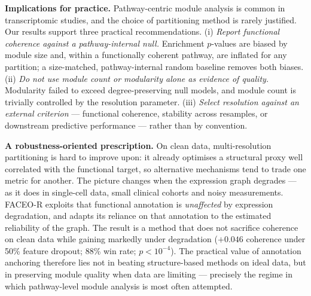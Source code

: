 \documentclass[twocolumn,10pt,a4paper]{article}
\begin{document}
\noindent\textbf{Implications for practice.} Pathway-centric module analysis is common in transcriptomic studies, and the choice of
partitioning method is rarely justified. Our results support three practical
recommendations. (i) \emph{Report functional coherence against a pathway-internal null.}
Enrichment $p$-values are biased by module size and, within a functionally coherent pathway,
are inflated for any partition; a size-matched, pathway-internal random baseline removes
both biases. (ii) \emph{Do not use module count or modularity alone as evidence of quality.}
Modularity failed to exceed degree-preserving null models, and module count is trivially
controlled by the resolution parameter. (iii) \emph{Select resolution against an external
criterion} --- functional coherence, stability across resamples, or downstream predictive
performance --- rather than by convention.

\noindent\textbf{A robustness-oriented prescription.} On clean data, multi-resolution partitioning is hard to improve upon: it already optimises a
structural proxy well correlated with the functional target, so alternative mechanisms tend
to trade one metric for another. The picture changes when the expression graph degrades ---
as it does in single-cell data, small clinical cohorts and noisy measurements. FACEO-R
exploits that functional annotation is \emph{unaffected} by expression degradation,
and adapts its reliance on that annotation to the estimated reliability of the graph. The
result is a method that does not sacrifice coherence on clean data while gaining markedly
under degradation ($+0.046$ coherence under 50\% feature dropout; 88\% win rate;
$p<10^{-4}$). The practical value of annotation anchoring therefore lies not in beating
structure-based methods on ideal data, but in preserving module quality when data are
limiting --- precisely the regime in which pathway-level module analysis is most often
attempted.
\end{document}
